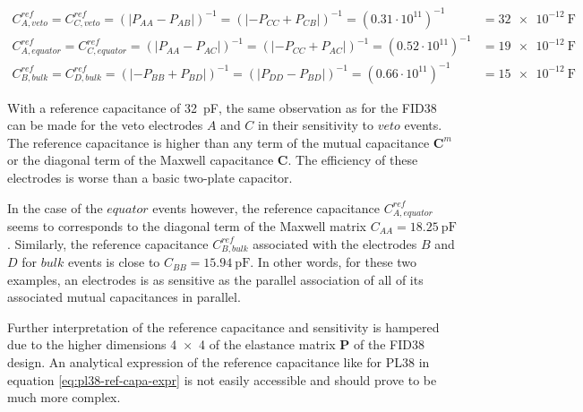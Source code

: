 \begin{align}
C_{A, veto}^{ref} = C_{C, veto}^{ref}
= \left( | P_{AA} - P_{AB} |\right)^{-1}
= \left( | -P_{CC} + P_{CB} |\right)^{-1}
= (0.31 \cdot 10^{11})^{-1}
&= \SI{32e-12}{\farad}
\\
C_{A, equator}^{ref} = C_{C, equator}^{ref}
= \left( | P_{AA} - P_{AC} |\right)^{-1}
= \left( | -P_{CC} + P_{AC} |\right)^{-1}
=(0.52 \cdot 10^{11})^{-1}
&= \SI{19e-12}{\farad}
\\
C_{B, bulk}^{ref} = C_{D, bulk}^{ref}
= \left( | -P_{BB} + P_{BD} |\right)^{-1}
= \left( | P_{DD} - P_{BD} |\right)^{-1}
= (0.66 \cdot 10^{11})^{-1}
&= \SI{15e-12}{\farad}
\end{align}

With a reference capacitance of \SI{32}{\pico\farad}, the same observation as for the FID38 can be made for the veto electrodes $A$ and $C$ in their sensitivity to $veto$ events. The reference capacitance is higher than any term of the mutual capacitance $\bm{C}^m$ or the diagonal term of the Maxwell capacitance $\bm{C}$. The efficiency of these electrodes is worse than a basic two-plate capacitor.

In the case of the $equator$ events however, the reference capacitance $C_{A, equator}^{ref}$ seems to corresponds to the diagonal term of the Maxwell matrix $C_{AA}=\SI{18.25}{\pico\farad}$. Similarly, the reference capacitance $C_{B, bulk}^{ref}$ associated with the electrodes $B$ and $D$ for $bulk$ events is close to $C_{BB} = \SI{15.94}{\pico\farad}$. In other words, for these two examples, an electrodes is as sensitive as the parallel association  of all of its associated mutual capacitances in parallel.

Further interpretation of the reference capacitance and sensitivity is hampered due to the higher dimensions \num{4 x 4} of the elastance matrix $\bm{P}$ of the FID38 design. An analytical expression of the reference capacitance like for PL38 in equation \ref{eq:pl38-ref-capa-expr} is not easily accessible and should prove to be much more complex.



